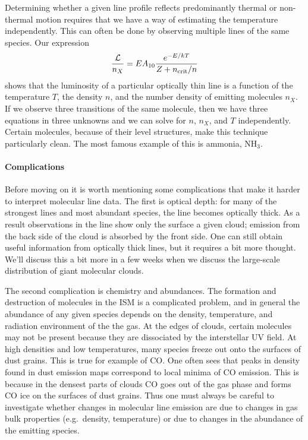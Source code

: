 Determining whether a given line profile reflects predominantly thermal or non-thermal motion requires that we have a way of estimating the temperature independently. This can often be done by observing multiple lines of the same species. Our expression
\begin{equation}
\frac{\mathcal{L}}{n_X} = E A_{10} \frac{e^{-E/kT}}{Z + n_{\rm crit}/n}
\end{equation}
shows that the luminosity of a particular optically thin line is a function of the temperature $T$, the density $n$, and the number density of emitting molecules $n_X$. If we observe three transitions of the same molecule, then we have three equations in three unknowns and we can solve for $n$, $n_X$, and $T$ independently. Certain molecules, because of their level structures, make this technique particularly clean. The most famous example of this is ammonia, NH$_3$.

\paragraph{Complications}

Before moving on it is worth mentioning some complications that make it harder to interpret molecular line data. The first is optical depth: for many of the strongest lines and most abundant species, the line becomes optically thick. As a result observations in the line show only the surface a given cloud; emission from the back side of the cloud is absorbed by the front side. One can still obtain useful information from optically thick lines, but it requires a bit more thought. We'll discuss this a bit more in a few weeks when we discuss the large-scale distribution of giant molecular clouds.

The second complication is chemistry and abundances. The formation and destruction of molecules in the ISM is a complicated problem, and in general the abundance of any given species depends on the density, temperature, and radiation environment of the the gas. At the edges of clouds, certain molecules may not be present because they are dissociated by the interstellar UV field. At high densities and low temperatures, many species freeze out onto the surfaces of dust grains. This is true for example of CO. One often sees that peaks in density found in dust emission maps correspond to local minima of CO emission. This is because in the densest parts of clouds CO goes out of the gas phase and forms CO ice on the surfaces of dust grains.  Thus one must always be careful to investigate whether changes in molecular line emission are due to changes in gas bulk properties (e.g.\ density, temperature) or due to changes in the abundance of the emitting species.


